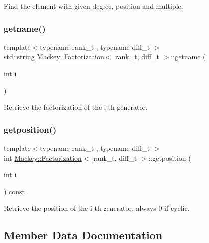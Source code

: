 Find the element with given degree, position and multiple. 

\mbox{\label{classMackey_1_1Factorization_ac5088227511baaaec1f62802b75d3a9e}} 
\subsubsection{\texorpdfstring{getname()}{getname()}}
{\footnotesize\ttfamily template$<$typename rank\+\_\+t , typename diff\+\_\+t $>$ \\
std\+::string \hyperlink{classMackey_1_1Factorization}{Mackey\+::\+Factorization}$<$ rank\+\_\+t, diff\+\_\+t $>$\+::getname (\begin{DoxyParamCaption}\item[{int}]{i }\end{DoxyParamCaption})}



Retrieve the factorization of the i-\/th generator. 

\mbox{\label{classMackey_1_1Factorization_aac1009ac7388e346e5fe4754686b28b7}} 
\subsubsection{\texorpdfstring{getposition()}{getposition()}}
{\footnotesize\ttfamily template$<$typename rank\+\_\+t , typename diff\+\_\+t $>$ \\
int \hyperlink{classMackey_1_1Factorization}{Mackey\+::\+Factorization}$<$ rank\+\_\+t, diff\+\_\+t $>$\+::getposition (\begin{DoxyParamCaption}\item[{int}]{i }\end{DoxyParamCaption}) const\hspace{0.3cm}{\ttfamily [inline]}}



Retrieve the position of the i-\/th generator, always 0 if cyclic. 



\subsection{Member Data Documentation}
\mbox{\label{classMackey_1_1Factorization_aafee5aadae0d83b75741e0e8c2955625}} 
